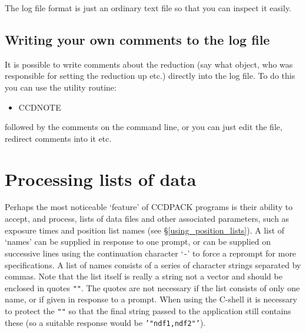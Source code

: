 \documentclass[twoside,11pt]{article}
\newcommand{\hyperref}[4]{#2\ref{#4}#3}
\newcommand{\htmlref}[2]{#1}
\newcommand{\xlabel}[1]{}
\renewcommand{\_}{\texttt{\symbol{95}}}
\newcommand{\text}[1]{{\small \tt #1}}
\newcommand{\xroutine}[1]{\htmlref{{\sc #1}}{#1}}
\begin{document}
The log file format is just an ordinary text file so that you can inspect
it easily.

\subsection{Writing your own comments to the log file}

It is possible to write comments about the reduction (say what object,
who was responsible for setting the reduction up etc.) directly into the
log file. To do this you can use the utility routine:
\begin{itemize}
\item \xroutine{CCDNOTE}
\end{itemize}

followed by the comments on the command line, or you can just edit the
file, redirect comments into it etc.

\section{Processing lists of data \label{ndflists} \xlabel{ndflists}}

Perhaps the most noticeable `feature' of CCDPACK programs is their ability to
accept, and process, lists of data files and other associated parameters,
such as exposure times and position list names (see
\hyperref{``using position lists''}{\S}{}{using_position_lists}).
A list of `names' can be supplied in
response to one prompt, or can be supplied on successive lines using the
continuation character `\text{-}' to force a reprompt for more
specifications. A list of names consists of a series of character
strings separated by commas. Note that the list itself is really a
string not a vector and should be enclosed in quotes \text{""}.
The quotes are not necessary if the list consists of only one name, or if
given in response to a prompt. When using the C-shell it is necessary to
protect the \text{""} so that the final string passed to the application
still contains these (so a suitable response would be \text{'"ndf1,ndf2"'}).
\end{document}

